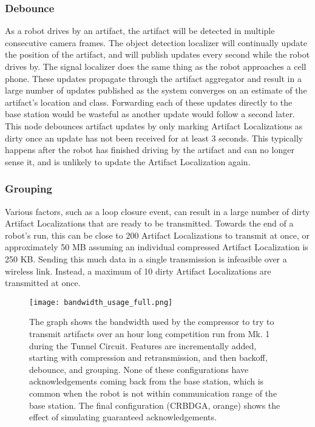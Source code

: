 \subsubsection{Debounce}
As a robot drives by an artifact, the artifact will be detected in multiple consecutive camera frames. The object detection localizer will continually update the position of the artifact, and will publish updates every second while the robot drives by. The signal localizer does the same thing as the robot approaches a cell phone. These updates propagate through the artifact aggregator and result in a large number of updates published as the system converges on an estimate of the artifact's location and class. Forwarding each of these updates directly to the base station would be wasteful as another update would follow a second later. This node debounces artifact updates by only marking Artifact Localizations as dirty once an update has not been received for at least 3 seconds. This typically happens after the robot has finished driving by the artifact and can no longer sense it, and is unlikely to update the Artifact Localization again.
	
\subsubsection{Grouping}
Various factors, such as a loop closure event, can result in a large number of dirty Artifact Localizations that are ready to be transmitted. Towards the end of a robot's run, this can be close to 200 Artifact Localizations to transmit at once, or approximately 50 MB assuming an individual compressed Artifact Localization is 250 KB. Sending this much data in a single transmission is infeasible over a wireless link. Instead, a maximum of 10 dirty Artifact Localizations are transmitted at once.
	
\begin{figure}	
	
	\centering		
	\texttt{[image: bandwidth\_usage\_full.png]}
	\caption[Artifact transmission bandwidth usage]{The graph shows the bandwidth used by the compressor to try to transmit artifacts over an hour long competition run from Mk. 1 during the Tunnel Circuit. Features are incrementally added, starting with compression and retransmission, and then backoff, debounce, and grouping. None of these configurations have acknowledgements coming back from the base station, which is common when the robot is not within communication range of the base station. The final configuration (CRBDGA, orange) shows the effect of simulating guaranteed acknowledgements.}
	\label{bandwidth_usage}
\end{figure}


